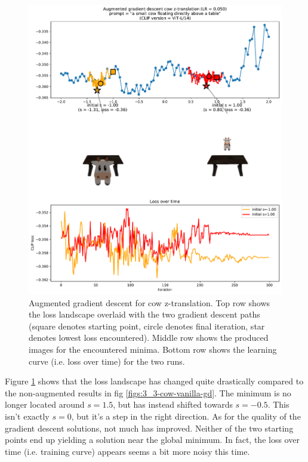 \begin{figure}[H]
    \centering
    \includegraphics[width=1.0\textwidth]{figures/3_3-cow-aug-gd.pdf}
    \caption{Augmented gradient descent for cow z-translation. Top row shows the loss landscape overlaid with the two gradient descent paths (square denotes starting point, circle denotes final iteration, star denotes lowest loss encountered). Middle row shows the produced images for the encountered minima. Bottom row shows the learning curve (i.e. loss over time) for the two runs.}
    \label{fig:3_3-cow-aug-gd}
\end{figure}

Figure \ref{fig:3_3-cow-aug-gd} shows that the loss landscape has changed quite drastically compared to the non-augmented results in fig \ref{figs:3_3-cow-vanilla-gd}. The minimum is no longer located around $s=1.5$, but has instead shifted towards $s=-0.5$. This isn't exactly $s=0$, but it's a step in the right direction.  As for the quality of the gradient descent solutions, not much has improved. Neither of the two starting points end up yielding a solution near the global minimum. In fact, the loss over time (i.e. training curve) appears seems a bit more noisy this time.


